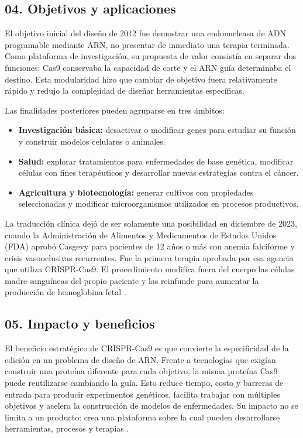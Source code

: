 \documentclass[11pt,letterpaper]{article}
\begin{document}
\subsection*{04. Objetivos y aplicaciones}

El objetivo inicial del diseño de 2012 fue demostrar una endonucleasa de ADN
programable mediante ARN, no presentar de inmediato una terapia terminada.
Como plataforma de investigación, su propuesta de valor consistía en separar
dos funciones: Cas9 conservaba la capacidad de corte y el ARN guía determinaba
el destino. Esta modularidad hizo que cambiar de objetivo fuera relativamente
rápido y redujo la complejidad de diseñar herramientas específicas.

Las finalidades posteriores pueden agruparse en tres ámbitos:

\begin{itemize}
  \item \textbf{Investigación básica:} desactivar o modificar genes para
    estudiar su función y construir modelos celulares o animales.
  \item \textbf{Salud:} explorar tratamientos para enfermedades de base
    genética, modificar células con fines terapéuticos y desarrollar nuevas
    estrategias contra el cáncer.
  \item \textbf{Agricultura y biotecnología:} generar cultivos con propiedades
    seleccionadas y modificar microorganismos utilizados en procesos
    productivos.
\end{itemize}

La traducción clínica dejó de ser solamente una posibilidad en diciembre de
2023, cuando la Administración de Alimentos y Medicamentos de Estados Unidos
(FDA) aprobó Casgevy para pacientes de 12 años o más con anemia falciforme y
crisis vasooclusivas recurrentes. Fue la primera terapia aprobada por esa
agencia que utiliza CRISPR-Cas9. El procedimiento modifica fuera del cuerpo las
células madre sanguíneas del propio paciente y las reinfunde para aumentar la
producción de hemoglobina fetal \parencite{fda2023}.

\subsection*{05. Impacto y beneficios}

El beneficio estratégico de CRISPR-Cas9 es que convierte la especificidad de la
edición en un problema de diseño de ARN. Frente a tecnologías que exigían
construir una proteína diferente para cada objetivo, la misma proteína Cas9
puede reutilizarse cambiando la guía. Esto reduce tiempo, costo y barreras de
entrada para producir experimentos genéticos, facilita trabajar con múltiples
objetivos y acelera la construcción de modelos de enfermedades. Su impacto no
se limita a un producto: crea una plataforma sobre la cual pueden desarrollarse
herramientas, procesos y terapias \parencite{nobel2020}.
\end{document}
